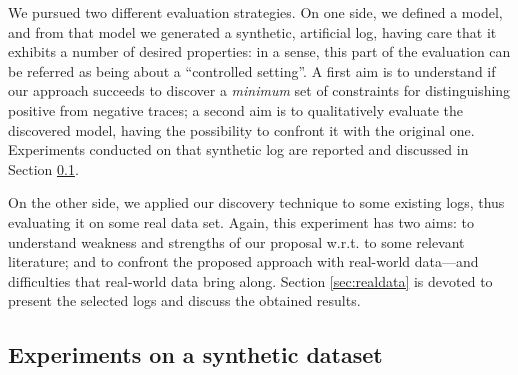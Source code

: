 We pursued two different evaluation strategies. On one side, we defined a model, and from that model we generated a synthetic, artificial log, having care that it exhibits a number of desired properties: in a sense, this part of the evaluation can be referred as being about a ``controlled setting''. A first aim is to understand if our approach succeeds to discover a \emph{minimum} set of constraints for distinguishing positive from negative traces; a second aim is to qualitatively evaluate the discovered model, having the possibility to confront it with the original one. Experiments conducted on that synthetic log are reported and discussed in Section \ref{sec:syntheticlog}.

On the other side, we applied our discovery technique to some existing logs, thus evaluating it on some real data set. Again, this experiment has two aims: to understand weakness and strengths of our proposal w.r.t. to some relevant literature; and to confront the proposed approach with real-world data---and difficulties that real-world data bring along. Section \ref{sec:realdata} is devoted to present the selected logs and discuss the obtained results.




\subsection{Experiments on a synthetic dataset}
\label{sec:syntheticlog}

%


